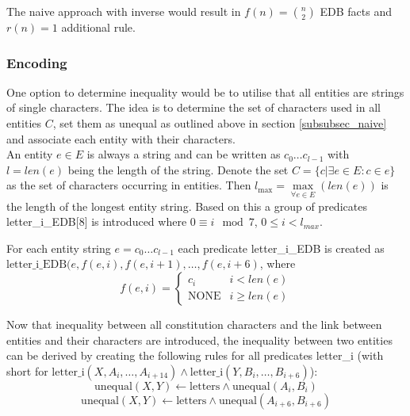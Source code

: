 \documentclass[hyperref,bachelorofscience,fleqn]{cgvpub}
\begin{document}
The naive approach with inverse would result in \(f(n) = \binom{n}{2}\) EDB facts and \(r(n) = 1\) additional rule.

\subsubsection{Encoding}\label{subsubsec_encoding}
One option to determine inequality would be to utilise that all entities are strings of single characters. The idea is to determine the set of characters used in all entities \(C\), set them as unequal as outlined above in section \ref{subsubsec_naive} and associate each entity with their characters.\\

An entity \(e \in E\) is always a string and can be written as \(c_0 \ldots c_{l - 1}\) with \(l = len(e)\) being the length of the string. Denote the set \(C = \{c | \exists e \in E: c \in e\}\) as the set of characters occurring in entities. Then \(l_{\max} = \max\limits_{\forall e \in E}(len(e))\) is the length of the longest entity string.
Based on this a group of predicates letter\_i\_EDB[8] is introduced where \(0 \equiv i \mod 7\), \(0 \leq i < l_{max} \).

For each entity string \(e = c_0 \ldots c_{l - 1}\) each predicate letter\_i\_EDB is created as \(\text{letter\_i\_EDB}(e, f(e, i), f(e, i+1), \ldots, f(e, i+6)\), where
\begin{equation*}
f(e, i) = 
\begin{cases}
      c_i & i < len(e) \\
      \text{NONE} & i \geq len(e)
\end{cases}
\end{equation*}

Now that inequality between all constitution characters and the link between entities and their characters are introduced, the inequality between two entities can be derived by creating the following rules for all predicates letter\_i (with  short for \(\text{letter\_i}(X, A_i, \ldots, A_{i+14}) \wedge\text{letter\_i}(Y, B_i, \ldots, B_{i+6})\)):
\begin{equation*}
\text{unequal}(X, Y) \leftarrow \text{letters} \wedge \text{unequal}(A_i, B_i)
\end{equation*}
\begin{equation*}
\text{unequal}(X, Y) \leftarrow \text{letters} \wedge \text{unequal}(A_{i+6}, B_{i+6})
\end{equation*}
\end{document}
